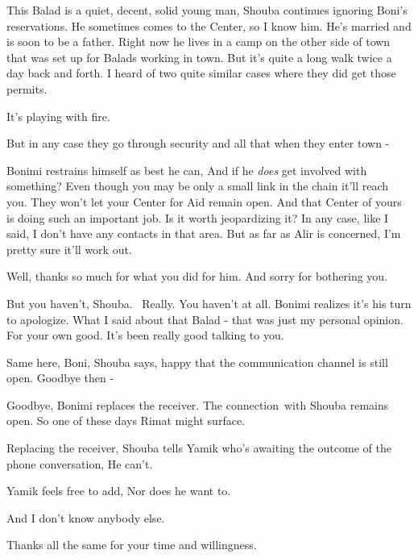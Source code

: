 \documentclass[letterpaper]{article}
\begin{document}
{\textquotedbl}This Balad is a quiet, decent, solid young man,{\textquotedbl} Shouba continues ignoring Boni's
reservations. {\textquotedbl}He sometimes comes to the Center, so I know him. He's married and is soon to be a father.
Right now he lives in a camp on the other side of town that was set up for Balads working in town. But it's quite a
long walk twice a day back and forth. I heard of two quite similar cases where they did get those
permits.{\textquotedbl}

{\textquotedbl}It's playing with fire.{\textquotedbl} 

{\textquotedbl}But in any case they go through security and all that when they enter town -{\textquotedbl}

Bonimi restrains himself as best he can, {\textquotedbl}And if he \textit{does} get involved with something? Even though
you may be only a small link in the chain it'll reach you. They won't let your Center for Aid remain open. And that
Center of yours is doing such an important job. Is it worth jeopardizing it? In any case, like I said, I don't have any
contacts in that area. But as far as Alir is concerned, I'm pretty sure it'll work out.{\textquotedbl} 

{\textquotedbl}Well, thanks so much for what you did for him. And sorry for bothering you.{\textquotedbl} 

{\textquotedbl}But you haven't, Shouba. \ Really. You haven't at all.{\textquotedbl} Bonimi realizes it's his turn to
apologize. {\textquotedbl}What I said about that Balad - that was just my personal opinion. For your own good. It's
been really good{ }talking to you.{\textquotedbl} 

{\textquotedbl}Same here, Boni,{\textquotedbl} Shouba says, happy that the communication channel is still open.
{\textquotedbl}Goodbye then -{\textquotedbl} 

{\textquotedbl}Goodbye,{\textquotedbl} Bonimi replaces the receiver. The connection~with Shouba remains open. So one of
these days Rimat might surface. 

Replacing the receiver, Shouba tells Yamik who's awaiting the outcome of the phone conversation, {\textquotedbl}He
can't.{\textquotedbl}

Yamik feels free to add, {\textquotedbl}Nor does he want to.{\textquotedbl}

{\textquotedbl}And I don't know anybody else.{\textquotedbl} 

{\textquotedbl}Thanks all the same for your time and willingness.{\textquotedbl}
\end{document}
